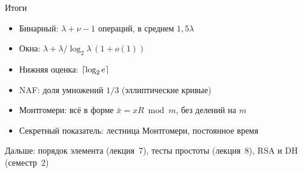 \documentclass{ca-slides}
\begin{document}
\begin{canvasframe}{Итоги}
  \begin{itemize}
    \item Бинарный: $\lambda + \nu - 1$ операций, в среднем $1{,}5\lambda$
    \item Окна: $\lambda + \lambda/\log_2\lambda\,(1 + o(1))$
    \item Нижняя оценка: $\lceil\log_2 e\rceil$
    \item NAF: доля умножений $1/3$ (эллиптические кривые)
    \item Монтгомери: всё в форме $\bar x = xR \bmod m$, без делений на $m$
    \item Секретный показатель: лестница Монтгомери, постоянное время
  \end{itemize}
  \medskip
  Дальше: порядок элемента (лекция~7), тесты простоты (лекция~8), RSA и DH (семестр~2)
\end{canvasframe}
\end{document}

